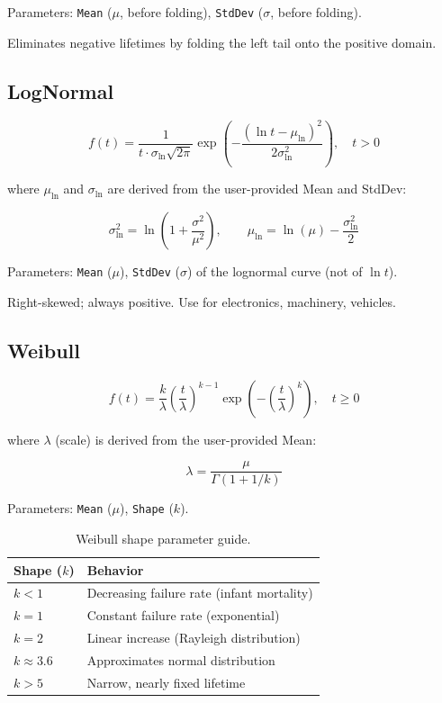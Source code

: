 Parameters: \texttt{Mean} ($\mu$, before folding), \texttt{StdDev} ($\sigma$, before folding).

Eliminates negative lifetimes by folding the left tail onto the positive domain.

\subsection{LogNormal}

\begin{equation}
  f(t) = \frac{1}{t \cdot \sigma_{\ln} \sqrt{2\pi}} \exp\left(-\frac{(\ln t - \mu_{\ln})^2}{2\sigma_{\ln}^2}\right), \quad t > 0
\end{equation}

where $\mu_{\ln}$ and $\sigma_{\ln}$ are derived from the user-provided Mean and StdDev:

\begin{equation}
  \sigma_{\ln}^2 = \ln\left(1 + \frac{\sigma^2}{\mu^2}\right), \qquad
  \mu_{\ln} = \ln(\mu) - \frac{\sigma_{\ln}^2}{2}
\end{equation}

Parameters: \texttt{Mean} ($\mu$), \texttt{StdDev} ($\sigma$) of the lognormal curve (not of $\ln t$).

Right-skewed; always positive. Use for electronics, machinery, vehicles.

\subsection{Weibull}

\begin{equation}
  f(t) = \frac{k}{\lambda}\left(\frac{t}{\lambda}\right)^{k-1} \exp\left(-\left(\frac{t}{\lambda}\right)^k\right), \quad t \geq 0
\end{equation}

where $\lambda$ (scale) is derived from the user-provided Mean:

\begin{equation}
  \lambda = \frac{\mu}{\Gamma(1 + 1/k)}
\end{equation}

Parameters: \texttt{Mean} ($\mu$), \texttt{Shape} ($k$).

\begin{table}[h]
\centering
\begin{tabular}{ll}
\toprule
\textbf{Shape ($k$)} & \textbf{Behavior} \\
\midrule
$k < 1$ & Decreasing failure rate (infant mortality) \\
$k = 1$ & Constant failure rate (exponential) \\
$k = 2$ & Linear increase (Rayleigh distribution) \\
$k \approx 3.6$ & Approximates normal distribution \\
$k > 5$ & Narrow, nearly fixed lifetime \\
\bottomrule
\end{tabular}
\caption{Weibull shape parameter guide.}
\end{table}

